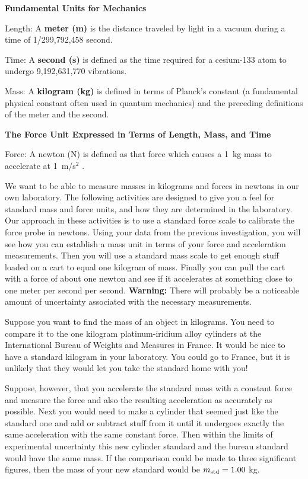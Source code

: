 \textbf{Fundamental Units for Mechanics }

Length: A \textbf{meter (m)} is the distance traveled by light in a vacuum during
a time of 1/299,792,458 second. 

Time: A \textbf{second (s)} is defined as the time required for a cesium-133
atom to undergo 9,192,631,770 vibrations. 


Mass: A \textbf{kilogram (kg)} is defined in terms of Planck's constant (a fundamental 
physical constant often used in quantum mechanics) and the preceding definitions of the
meter and the second.

\textbf{The Force Unit Expressed in Terms of Length, Mass, and Time} 

Force: A newton (N) is defined as that force which causes a 1~kg mass to accelerate
at 1~m/s$^2$ . 

We want to be able to measure masses in kilograms and forces in newtons in our
own laboratory. The following activities are designed to give you a feel for
standard mass and force units, and how they are determined in the laboratory.
Our approach in these activities is to use a standard force scale to calibrate
the force probe in newtons. Using your data from the previous investigation,
you will see how you can establish a mass unit in terms of your force and acceleration
measurements. Then you will use a standard mass scale to get enough stuff loaded
on a cart to equal one kilogram of mass. Finally you can pull the cart with
a force of about one newton and see if it accelerates at something close to
one meter per second per second. \textbf{Warning:} There will probably be a
noticeable amount of uncertainty associated with the necessary measurements.

Suppose you want to find the mass of an object in kilograms. You need to compare
it to the one kilogram platinum-iridium alloy cylinders at the International
Bureau of Weights and Measures in France. It would be nice to have a standard
kilogram in your laboratory. You could go to France, but it is unlikely that
they would let you take the standard home with you!

Suppose, however, that you accelerate the standard mass with a constant force
and measure the force and also the resulting acceleration as accurately as possible.
Next you would need to make a cylinder that seemed just like the standard one
and add or subtract stuff from it until it undergoes exactly the same acceleration
with the same constant force. Then within the limits of experimental uncertainty
this new cylinder standard and the bureau standard would have the same mass.
If the comparison could be made to three significant figures, then the mass
of your new standard would be \( m_{\rm std}  = 1.00\) kg.

